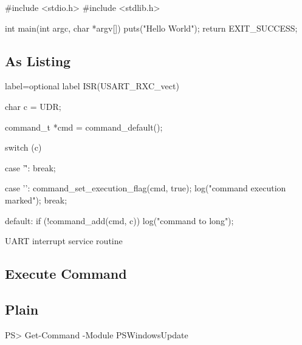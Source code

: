 \documentclass[10pt,a4paper,parskip=half]{scrartcl}
\theoremstyle{plain}
\newcommand{\exec}[1]{}
\begin{document}
\begin{code}
#include <stdio.h>
#include <stdlib.h>

int main(int argc, char *argv[]) {
    puts("Hello World");
    return EXIT_SUCCESS;
}
\end{code}


\subsection{As Listing}
\label{sub:as_listing}

\begin{listing}[h!]
    \begin{ccode*}{label={optional label}}
ISR(USART_RXC_vect) {
    char c = UDR;

    command_t *cmd = command_default();

    switch (c) {
        case '\r':
            break;

        case '\n':
            command_set_execution_flag(cmd, true);
            log("command execution marked");
            break;

        default:
            if (!command_add(cmd, c)) {
                log("command to long");
            }
    }
}
    \end{ccode*}
    \caption{UART interrupt service routine}
    \label{lst:uart_isr}
\end{listing}

\subsection{Execute Command}
\label{sub:execute_command}

\exec{"uname -a"}

\subsection{Plain}
\label{sub:plain}

\begin{pre}
    PS> Get-Command -Module PSWindowsUpdate
\end{pre}
\end{document}
